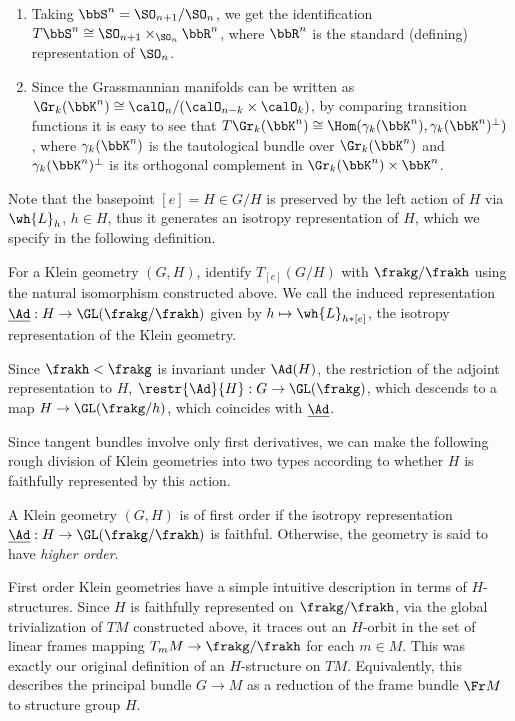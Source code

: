 \begin{example}
    \begin{enumerate}
        \item Taking $\bbS^n=\SO_{n+1}\slash \SO_n$, we get the identification $T\bbS^n\cong \SO_{n+1}\times_{\SO_n}\bbR^n$, where $\bbR^n$ is the standard (defining) representation of $\SO_n$.
        \item Since the Grassmannian manifolds can be written as $\Gr_k(\bbK^n)\cong \calO_n\slash (\calO_{n-k}\times \calO_{k})$, by comparing transition functions it is easy to see that $T\Gr_k(\bbK^n)\cong \Hom(\gamma_k(\bbK^n),\gamma_k(\bbK^n)^\perp)$, where $\gamma_k(\bbK^n)$ is the tautological bundle over $\Gr_k(\bbK^n)$ and $\gamma_k(\bbK^n)^\perp$ is its orthogonal complement in $\Gr_k(\bbK^n)\times \bbK^n$.
    \end{enumerate}
\end{example}


Note that the basepoint $[e]=H\in G\slash H$ is preserved by the left action of $H$ via $\wh{L}_h$, $h\in H$, thus it generates an isotropy representation of $H$, which we specify in the following definition.

\begin{defn}
    For a Klein geometry $(G,H)$, identify $T_{[e]}(G\slash H)$ with $\frakg\slash\frakh$ using the natural isomorphism constructed above. We call the induced representation $\underline{\Ad}:H\to \GL(\frakg\slash\frakh)$ given by $h\mapsto \wh{L}_{h\ast [e]}$, the isotropy representation of the Klein geometry.

    Since $\frakh<\frakg$ is invariant under $\Ad(H)$, the restriction of the adjoint representation to $H$, $\restr{\Ad}{H}:G\to \GL(\frakg)$, which descends to a map $H\to \GL(\frakg\slash h)$, which coincides with $\underline{\Ad}$.
\end{defn}

Since tangent bundles involve only first derivatives, we can make the following rough division of Klein geometries into two types according to whether $H$ is faithfully represented by this action.

\begin{defn}
    A Klein geometry $(G,H)$ is of first order if the isotropy representation $\underline{\Ad}:H\to \GL(\frakg\slash\frakh)$ is faithful. Otherwise, the geometry is said to have \emph{higher order}.
\end{defn}

\begin{rem}
    First order Klein geometries have a simple intuitive description in terms of $H$-structures. Since $H$ is faithfully represented on $\frakg\slash\frakh$, via the global trivialization of $TM$ constructed above, it traces out an $H$-orbit in the set of linear frames mapping $T_mM\to \frakg\slash\frakh$ for each $m\in M$. This was exactly our original definition of an $H$-structure on $TM$. Equivalently, this describes the principal bundle $G\to M$ as a reduction of the frame bundle $\Fr M$ to structure group $H$.
\end{rem}

